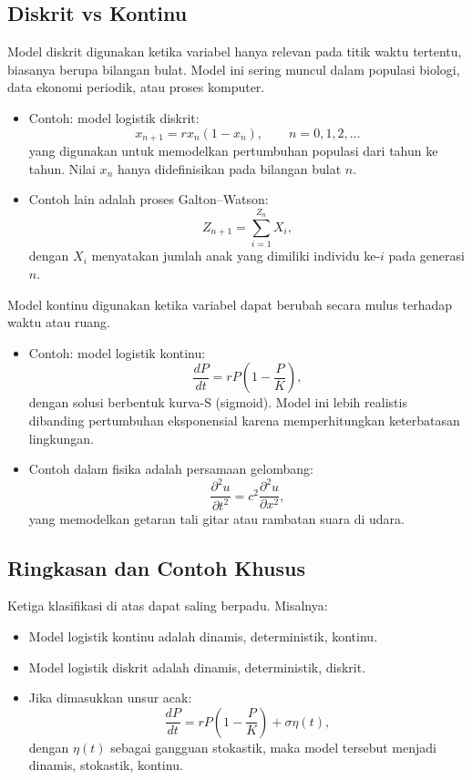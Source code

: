 \documentclass{bukumjh}
\begin{document}
\subsection{Diskrit vs Kontinu}

{\jsg Model diskrit} digunakan ketika variabel hanya relevan pada titik waktu tertentu, biasanya berupa bilangan bulat. Model ini sering muncul dalam populasi biologi, data ekonomi periodik, atau proses komputer.  

\begin{itemize}
    \item Contoh: model logistik diskrit:
    \[
    x_{n+1} = r x_n (1 - x_n), \qquad n=0,1,2,\dots
    \]
    yang digunakan untuk memodelkan pertumbuhan populasi dari tahun ke tahun. Nilai $x_n$ hanya didefinisikan pada bilangan bulat $n$.
    
    \item Contoh lain adalah proses Galton–Watson:
    \[
    Z_{n+1} = \sum_{i=1}^{Z_n} X_i,
    \]
    dengan $X_i$ menyatakan jumlah anak yang dimiliki individu ke-$i$ pada generasi $n$.
\end{itemize}

{\jsg Model kontinu} digunakan ketika variabel dapat berubah secara mulus terhadap waktu atau ruang.  

\begin{itemize}
    \item Contoh: model logistik kontinu:
    \[
    \frac{dP}{dt} = rP\left(1-\frac{P}{K}\right),
    \]
    dengan solusi berbentuk kurva-S (sigmoid). Model ini lebih realistis dibanding pertumbuhan eksponensial karena memperhitungkan keterbatasan lingkungan.
    
    \item Contoh dalam fisika adalah persamaan gelombang:
    \[
    \frac{\partial^2 u}{\partial t^2} = c^2 \frac{\partial^2 u}{\partial x^2},
    \]
    yang memodelkan getaran tali gitar atau rambatan suara di udara.
\end{itemize}

\subsection*{Ringkasan dan Contoh Khusus}

Ketiga klasifikasi di atas dapat saling berpadu. Misalnya:
\begin{itemize}
    \item Model logistik kontinu adalah {\jsg dinamis, deterministik, kontinu}.
    \item Model logistik diskrit adalah {\jsg dinamis, deterministik, diskrit}.
    \item Jika dimasukkan unsur acak:
    \[
    \frac{dP}{dt} = rP\left(1-\frac{P}{K}\right) + \sigma \eta(t),
    \]
    dengan $\eta(t)$ sebagai gangguan stokastik, maka model tersebut menjadi {\jsg dinamis, stokastik, kontinu}.
\end{itemize}
\end{document}
